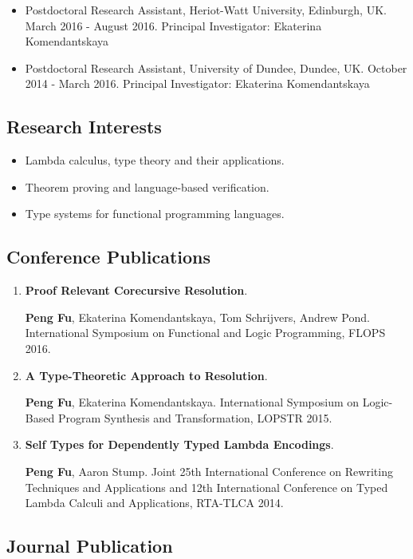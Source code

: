 \documentclass{article}
\begin{document}
\begin{itemize}
\item Postdoctoral Research Assistant, Heriot-Watt University, Edinburgh, UK. March 2016 - August 2016. Principal Investigator: Ekaterina Komendantskaya
\item Postdoctoral Research Assistant, University of Dundee, Dundee, UK. October 2014 - March 2016. Principal Investigator: Ekaterina Komendantskaya
\end{itemize}

\subsection*{Research Interests}
\begin{itemize}
\item Lambda calculus, type theory and their applications.
\item Theorem proving and language-based verification. 
\item Type systems for functional programming languages. 
  
\end{itemize}

\subsection*{Conference Publications}

\begin{enumerate}

\item \textbf{Proof Relevant Corecursive Resolution}. 

  \textbf{Peng Fu}, Ekaterina Komendantskaya, Tom Schrijvers, Andrew Pond. International Symposium on Functional and Logic Programming, FLOPS 2016.
\item \textbf{A Type-Theoretic Approach to Resolution}. 
  
  \textbf{Peng Fu}, Ekaterina Komendantskaya. International Symposium on Logic-Based Program Synthesis and Transformation, LOPSTR 2015.
  \item \textbf{Self Types for Dependently Typed Lambda Encodings}. 
    
    \textbf{Peng Fu}, Aaron Stump. Joint 25th International Conference on Rewriting Techniques and Applications and 12th International Conference on Typed Lambda Calculi and Applications, RTA-TLCA 2014. 
\end{enumerate}

\subsection*{Journal Publication}
\end{document}
